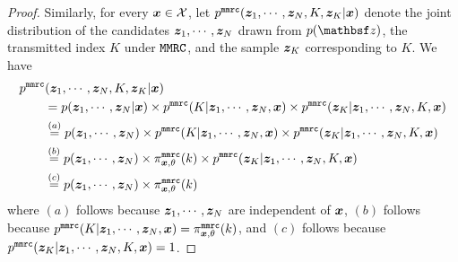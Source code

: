 \begin{proof}
Similarly, for every $\svbx \in \cX$, let $\pMMRC(\svbz_1, \cdots, \svbz_N, K, \svbz_K | \svbx)$ denote the joint distribution of the candidates $\svbz_1, \cdots, \svbz_N$ drawn from $p(\rvbz)$,  the transmitted index $K$ under $\MMRC$, and the sample $\svbz_K$ corresponding to $K$. We have
\begin{align}
& \pMMRC(\svbz_1, \cdots, \svbz_N, K, \svbz_K | \svbx) \\
& \qquad =  p(\svbz_1, \cdots, \svbz_N | \svbx)  \times \pMMRC(K | \svbz_1, \cdots, \svbz_N, \svbx) \times \pMMRC(\svbz_K | \svbz_1, \cdots, \svbz_N, K, \svbx)\\
& \qquad \stackrel{(a)}{=} p(\svbz_1, \cdots, \svbz_N) \times \pMMRC(K | \svbz_1, \cdots, \svbz_N, \svbx) \times \pMMRC(\svbz_K | \svbz_1, \cdots, \svbz_N, K, \svbx)\\
& \qquad \stackrel{(b)}{=} p(\svbz_1, \cdots, \svbz_N) \times \piMMRC_{\svbx, \theta}(k) \times \pMMRC(\svbz_K | \svbz_1, \cdots, \svbz_N, K, \svbx)\\
& \qquad \stackrel{(c)}{=} p(\svbz_1, \cdots, \svbz_N) \times \piMMRC_{\svbx, \theta}(k) \label{eq:mmrc_generic_4}
\end{align}
where $(a)$ follows because $\svbz_1, \cdots, \svbz_N$ are independent of $\svbx$, $(b)$ follows because $\pMMRC(K | \svbz_1, \cdots, \svbz_N, \svbx) = \piMMRC_{\svbx, \theta}(k)$, and $(c)$ follows because $\pMMRC(\svbz_K | \svbz_1, \cdots, \svbz_N, K, \svbx) = 1$. 


\end{proof}
